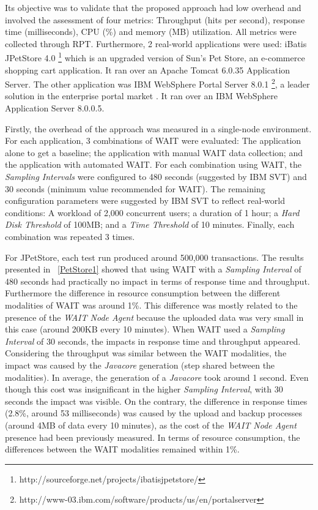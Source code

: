 \documentclass[runningheads,a4paper]{llncs}
\begin{document}
Its objective was to validate that the proposed approach had low overhead and
involved the assessment of four metrics: Throughput (hits per second), response
time (milliseconds), CPU (\%) and memory (MB) utilization. All metrics were
collected through RPT. Furthermore, 2 real-world applications were used: iBatis JPetStore
4.0 \footnote{http://sourceforge.net/projects/ibatisjpetstore/} which is an upgraded
version of Sun's Pet Store, an e-commerce shopping cart application. It ran over
an Apache Tomcat 6.0.35 Application Server. The other application was IBM
WebSphere Portal Server 8.0.1 \footnote{http://www-03.ibm.com/software/products/us/en/portalserver},
a leader solution in the enterprise portal market \cite{Gartner2008}. It ran
over an IBM WebSphere Application Server 8.0.0.5.

Firstly, the overhead of the approach was measured in a single-node environment.
For each application, 3 combinations of WAIT were evaluated: The application
alone to get a baseline; the application with manual WAIT data collection;
and the application with automated WAIT. For each combination using WAIT, the
\emph{Sampling Intervals} were configured to 480 seconds (suggested by IBM SVT)
and 30 seconds (minimum value recommended for WAIT). The remaining configuration
parameters were suggested by IBM SVT to reflect real-world conditions:
A workload of 2,000 concurrent users; a duration of 1 hour; a \emph{Hard Disk
Threshold} of 100MB; and a \emph{Time Threshold} of 10 minutes. Finally, each
combination was repeated 3 times.

For JPetStore, each test run produced around 500,000 transactions. The results
presented in \tablename ~\ref{PetStore1} showed that using WAIT with a
\emph{Sampling Interval} of 480 seconds had practically no impact in terms of
response time and throughput. Furthermore the difference in resource consumption
between the different modalities of WAIT was around 1\%.  This difference was
mostly related to the presence of the \emph{WAIT Node Agent} because the
uploaded data was very small in this case (around 200KB every 10 minutes). When
WAIT used a \emph{Sampling Interval} of 30 seconds, the impacts in response time
and throughput appeared. Considering the throughput was similar between
the WAIT modalities, the impact was caused by the \emph{Javacore} generation
(step shared between the modalities). In average, the generation of a
\emph{Javacore} took around 1 second. Even though this cost was insignificant in the higher
\emph{Sampling Interval}, with 30 seconds the impact was visible. On the contrary, 
the difference in response times (2.8\%, around 53 milliseconds) was caused
by the upload and backup processes (around 4MB of data every 10 minutes), as the
cost of the \emph{WAIT Node Agent} presence had been previously measured. In
terms of resource consumption, the differences between the WAIT
modalities remained within 1\%.
\end{document}
